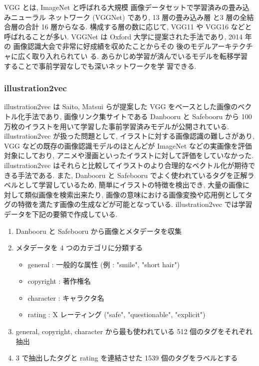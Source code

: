 VGG \cite{brusilovsky:simonyan2014very} とは, ImageNet と呼ばれる大規模
画像データセットで学習済みの畳み込みニューラル
ネットワーク (VGGNet) であり, 13 層の畳み込み層
と3 層の全結合層の合計 16 層からなる. 構成する層の数に応じて, VGG11 や VGG16 などと呼ばれることが多い. VGGNet は Oxford 大学に提案された手法であり, 2014 年の
画像認識大会で非常に好成績を収めたことからその
後のモデルアーキテクチャに広く取り入れられてい
る. あらかじめ学習が済んでいるモデルを転移学習
することで事前学習なしでも深いネットワークを学
習できる.

\changeindent{0cm}
\subsubsection{illustration2vec}
\changeindent{2cm}

illustration2vec \cite{i2v} は Saito, Matsui らが提案した VGG をベースとした画像のベクトル化手法であり, 画像リンク集サイトである Danbooru と Safebooru から 100 万枚のイラストを用いて学習した事前学習済みモデルが公開されている. illustration2vec が扱った問題として, イラストに対する画像認識の難しさがあり, VGG などの既存の画像認識モデルのほとんどが ImageNet \cite{imagenet_cvpr09} などの実画像を評価対象にしており, アニメや漫画といったイラストに対して評価をしていなかった. illustration2vec はそれらと比較してイラストのより合理的なベクトル化が期待できる手法である. また, Danbooru と Safebooru でよく使われているタグを正解ラベルとして学習しているため, 簡単にイラストの特徴を検出でき, 大量の画像に対して類似画像を検索出来たり, 画像の意味における画像変換や応用例としてタグの特徴を満たす画像の生成などが可能となっている.
\newpage
illustration2vec では学習データを下記の要領で作成している.

\begin{enumerate}
  \item Danbooru と Safebooru から画像とメタデータを収集
  \item メタデータを 4 つのカテゴリに分類する
        \begin{itemize}
          \item general : 一般的な属性 (例 : "smile", "short hair")
          \item copyright : 著作権名
          \item character : キャラクタ名
          \item rating : X レーティング ("safe", "questionable", "explicit")
        \end{itemize}
  \item general, copyright, character から最も使われている 512 個のタグをそれぞれ抽出
  \item 3 で抽出したタグと rating を連結させた 1539 個のタグをラベルとする
\end{enumerate}
